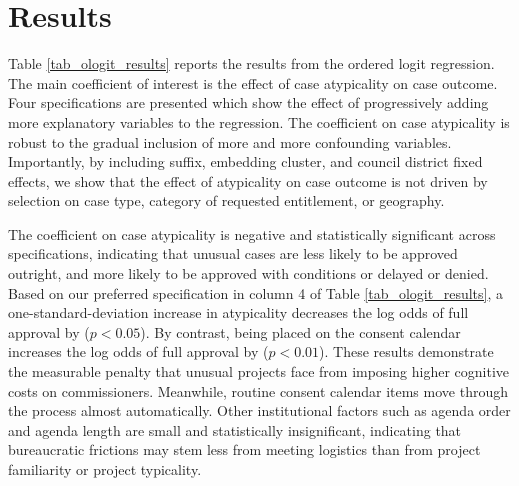 \section{Results}
\label{sec_results}

Table \ref{tab_ologit_results} reports the results from the ordered logit regression. The main coefficient of interest is the effect of case atypicality on case outcome. Four specifications are presented which show the effect of progressively adding more explanatory variables to the regression. The coefficient on case atypicality is robust to the gradual inclusion of more and more confounding variables. Importantly, by including suffix, embedding cluster, and council district fixed effects, we show that the effect of atypicality on case outcome is not driven by selection on case type, category of requested entitlement, or geography.  


The coefficient on case atypicality is negative and statistically significant across specifications, indicating that unusual cases are less likely to be approved outright, and more likely to be approved with conditions or delayed or denied. Based on our preferred specification in column 4 of Table \ref{tab_ologit_results}, a one-standard-deviation increase in atypicality decreases the log odds of full approval by  ($p<0.05$). By contrast, being placed on the consent calendar increases the log odds of full approval by  ($p<0.01$). These results demonstrate the measurable penalty that unusual projects face from imposing higher cognitive costs on commissioners. Meanwhile, routine consent calendar items move through the process almost automatically. Other institutional factors such as agenda order and agenda length are small and statistically insignificant, indicating that bureaucratic frictions may stem less from meeting logistics than from project familiarity or project typicality.


